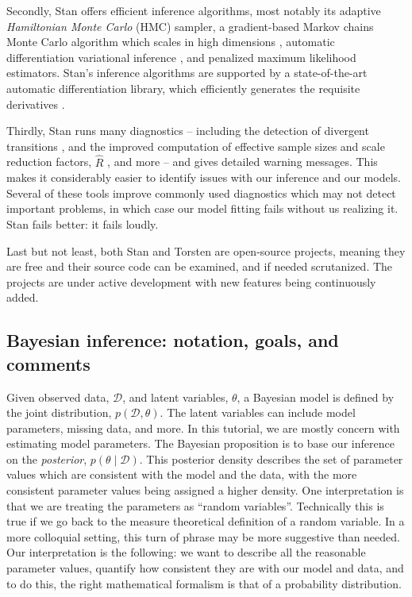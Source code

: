 Secondly, Stan offers efficient inference algorithms, most notably its adaptive \textit{Hamiltonian Monte Carlo} (HMC) sampler, a gradient-based Markov chains Monte Carlo algorithm which scales in high dimensions \cite{Betancourt:2018, Hoffman:2014}, automatic differentiation variational inference \cite{author:0000}, and penalized maximum likelihood estimators.
Stan's inference algorithms are supported by a state-of-the-art automatic differentiation library, which efficiently generates the requisite derivatives \cite{Carpenter:2015}.

Thirdly, Stan runs many diagnostics -- including the detection of divergent transitions \cite{Betancourt:2018}, and the improved computation of effective sample sizes and scale reduction factors, $\hat R$ \cite{Vehtari:2020}, and more -- and gives detailed warning messages.
This makes it considerably easier to identify issues with our inference and our models.
Several of these tools improve commonly used diagnostics which may not detect important problems, in which case our model fitting fails without us realizing it.
Stan fails better: it fails loudly. 

Last but not least, both Stan and Torsten are open-source projects, meaning  they are free and their source code can be examined, and if needed scrutanized.
The projects are under active development with new features being continuously added.

\subsection{Bayesian inference: notation, goals, and comments}

Given observed data, $\mathcal D$, and latent variables, $\theta$, a Bayesian model is defined by the joint distribution, $p(\mathcal D, \theta)$.
The latent variables can include model parameters, missing data, and more.
In this tutorial, we are mostly concern with estimating model parameters.
The Bayesian proposition is to base our inference on the \textit{posterior}, $p(\theta \mid \mathcal D)$.
This posterior density describes the set of parameter values which are consistent with the model and the data, with the more consistent parameter values being assigned a higher density.
One interpretation is that we are treating the parameters as ``random variables''.
Technically this is true if we go back to the measure theoretical definition of a random variable. 
In a more colloquial setting, this turn of phrase may be more suggestive than needed.
Our interpretation is the following: we want to describe all the reasonable parameter values, quantify how consistent they are with our model and data, and to do this, the right mathematical formalism is that of a probability distribution.

